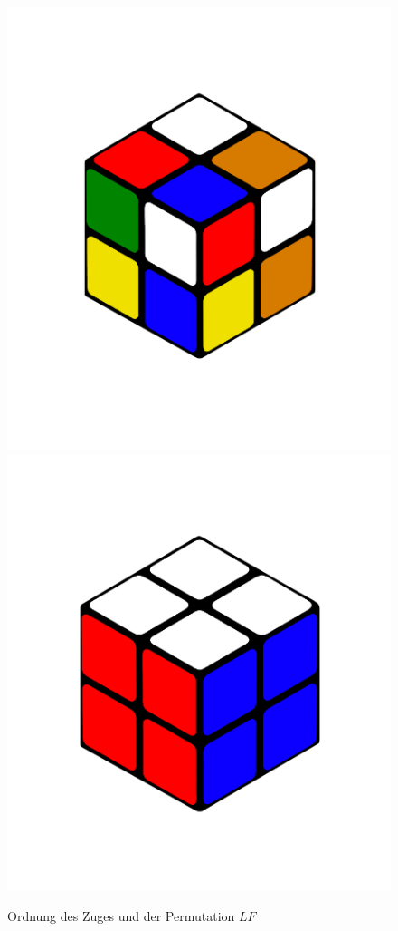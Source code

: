 \documentclass[12pt,a4paper, usenames, dvipsnames]{article}
\theoremstyle{mystyle}
\theoremstyle{definition}
\begin{document}
\begin{figure}[H]
\centering
\includegraphics[scale=0.12]{LLFF_5.png}
\includegraphics[scale=0.12]{2x2solved.png}
\caption{Ordnung des Zuges und der Permutation $LF$}
\label{Abbildung_LF_5_15}
\end{figure}
\end{document}
